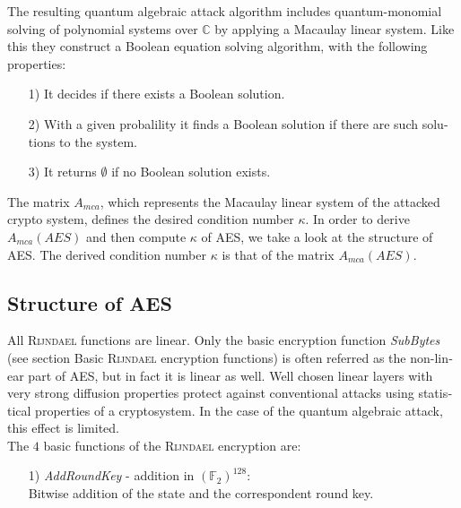 \documentclass[a4paper,11pt]{article}
\begin{document}
\begin{otherlanguage}{english}
\noindent
The resulting quantum algebraic attack algorithm includes quantum-monomial solving of polynomial systems over $\mathbb{C}$ by applying a Macaulay linear system. Like this they construct a Boolean equation solving algorithm, with the following properties: \\

\begin{itemize} [noitemsep, nolistsep]
  \item[1)] It decides if there exists a Boolean solution.
  \vspace{0.1cm}
  \item[2)] With a given probalility it finds a Boolean solution if there are such solutions to the system.
  \vspace{0.1cm}
  \item[3)] It returns $\emptyset$ if no Boolean solution exists.
\end{itemize}
\vspace{0.5cm}

\noindent
The matrix $A_{mca}$, which represents the Macaulay linear system of the attacked crypto system, defines the desired condition number $\kappa$. In order to derive $A_{mca}(AES)$ and then compute $\kappa$ of \textsc{AES}, we take a look at the structure of \textsc{AES}. The derived condition number $\kappa$ is that of the matrix $A_{mca}(AES)$.


\subsection{Structure of \textsc{AES}}
\noindent
All \textsc{Rijndael} functions are linear. Only the basic encryption function \textit{SubBytes} (see section Basic \textsc{Rijndael} encryption functions) is often referred as the non-linear part of \textsc{AES}, but in fact it is linear as well. Well chosen linear layers with very strong diffusion properties protect against conventional attacks using statistical properties of a cryptosystem. In the case of the quantum algebraic attack, this effect is limited. \\


The $4$ basic functions of the \textsc{Rijndael} encryption are: \\

\begin{itemize} [noitemsep, nolistsep]
  \item[1)] \textit{AddRoundKey} - addition in ${(\mathbb{F}_2)}^{128}$: \\ 
  Bitwise addition of the state and the correspondent round key.
  \vspace{0.1cm}


\end{itemize}
\end{otherlanguage}
\end{document}
